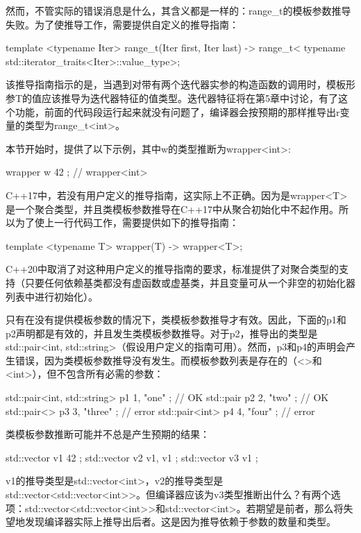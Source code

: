 然而，不管实际的错误消息是什么，其含义都是一样的：range_t的模板参数推导失败。为了使推导工作，需要提供自定义的推导指南：

\begin{cppcode}
template <typename Iter>
range_t(Iter first, Iter last) ->
range_t<
typename std::iterator_traits<Iter>::value_type>;
\end{cppcode}

该推导指南指示的是，当遇到对带有两个迭代器实参的构造函数的调用时，模板形参T的值应该推导为迭代器特征的值类型。迭代器特征将在第5章中讨论，有了这个功能，前面的代码段运行起来就没有问题了，编译器会按预期的那样推导出r变量的类型为range_t<int>。

本节开始时，提供了以下示例，其中w的类型推断为wrapper<int>:

\begin{cppcode}
wrapper w{ 42 }; // wrapper<int>
\end{cppcode}

C++17中，若没有用户定义的推导指南，这实际上不正确。因为是wrapper<T>是一个聚合类型，并且类模板参数推导在C++17中从聚合初始化中不起作用。所以为了使上一行代码工作，需要提供如下的推导指南：

\begin{cppcode}
template <typename T>
wrapper(T) -> wrapper<T>;
\end{cppcode}

C++20中取消了对这种用户定义的推导指南的要求，标准提供了对聚合类型的支持（只要任何依赖基类都没有虚函数或虚基类，并且变量可从一个非空的初始化器列表中进行初始化）。

只有在没有提供模板参数的情况下，类模板参数推导才有效。因此，下面的p1和p2声明都是有效的，并且发生类模板参数推导。对于p2，推导出的类型是std::pair<int, std::string>（假设用户定义的指南可用）。然而，p3和p4的声明会产生错误，因为类模板参数推导没有发生。而模板参数列表是存在的（<>和<int>），但不包含所有必需的参数：

\begin{cppcode}
std::pair<int, std::string> p1{ 1, "one" }; // OK
std::pair p2{ 2, "two" }; // OK
std::pair<> p3{ 3, "three" }; // error
std::pair<int> p4{ 4, "four" }; // error
\end{cppcode}

类模板参数推断可能并不总是产生预期的结果：

\begin{cppcode}
std::vector v1{ 42 };
std::vector v2{ v1, v1 };
std::vector v3{ v1 };
\end{cppcode}

v1的推导类型是std::vector<int>，v2的推导类型是std::vector<std::vector<int>>。但编译器应该为v3类型推断出什么？有两个选项：std::vector<std::vector<int>>和std::vector<int>。若期望是前者，那么将失望地发现编译器实际上推导出后者。这是因为推导依赖于参数的数量和类型。

